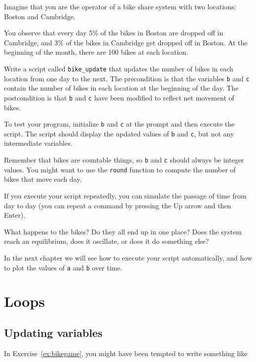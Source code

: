 \documentclass[
]{book}
\numberwithin{Answer}{chapter}
\numberwithin{Exercise}{chapter}
\begin{document}
\begin{ex}
\label{ex:bikegame}

Imagine that you are the operator of a bike share system with two
locations: Boston and Cambridge.

You observe that every day 5\%
of the bikes in Boston are dropped off in Cambridge, and 3\% of the bikes
in Cambridge get dropped off in Boston.
At the beginning of the month, there are 100 bikes at each location.

Write a script called \verb"bike_update" that updates the number
of bikes in each location from one day to the next.  The precondition
is that the variables {\tt b} and {\tt c} contain the number of bikes
in each location at the beginning of the day.  The postcondition
is that {\tt b} and {\tt c} have been modified to reflect net movement of bikes.

To test your program, initialize {\tt b} and {\tt c} at
the prompt and then execute the script.  The script should display
the updated values of {\tt b} and {\tt c}, but not any intermediate
variables.

Remember that bikes are countable things, so {\tt b} and {\tt c} should always be integer values.  You might want to use the {\tt round} function
to compute the number of bikes that move each day.

If you execute your script repeatedly, you can simulate the passage
of time from day to day (you can repeat a command by pressing the {\sf Up} arrow and then {\sf Enter}).

What happens to the bikes?  Do they all end up in one place?  Does the system reach an equilibrium, does it oscillate, or does it do something else?

In the next chapter we will see how to execute your script automatically,
and how to plot the values of {\tt a} and {\tt b} over time.
\end{ex}



\chapter{Loops}

\section{Updating variables}

In Exercise~\ref{ex:bikegame}, you might have been tempted to write something
like
\end{document}
